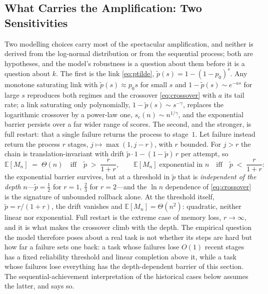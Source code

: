 \documentclass{article}
\begin{document}
\subsection{What Carries the Amplification: Two Sensitivities}\label{ssec:sensitivity}
Two modelling choices carry most of the spectacular amplification, and neither is derived from the log-normal distribution or from the sequential process; both are hypotheses, and the model's robustness is a question about them before it is a question about $k$. The first is the link \eqref{eq:ptilde}, $\widetilde{p}(s) = 1 - (1-p_0)^{s}$. Any monotone saturating link with $\widetilde{p}(s) \approx p_0 s$ for small $s$ and $1 - \widetilde{p}(s) \sim e^{-a s}$ for large $s$ reproduces both regimes and the crossover \eqref{eq:crossover} with $a$ its tail rate; a link saturating only polynomially, $1 - \widetilde{p}(s) \sim s^{-\gamma}$, replaces the logarithmic crossover by a power-law one, $s_c(n) \sim n^{1/\gamma}$, and the exponential barrier persists over a far wider range of scores. The second, and the stronger, is full restart: that a single failure returns the process to stage~$1$. Let failure instead return the process $r$ stages, $j \mapsto \max(1, j - r)$, with $r$ bounded. For $j > r$ the chain is translation-invariant with drift $\widetilde{p} \cdot 1 - (1 - \widetilde{p})\, r$ per attempt, so
\begin{equation}\label{eq:rollback}
\mathbb{E}[M_n] \;=\; \Theta(n) \quad\text{iff}\quad \widetilde{p} \;>\; \frac{r}{1+r}, \qquad \mathbb{E}[M_n] \;\text{exponential in } n \quad\text{iff}\quad \widetilde{p} \;<\; \frac{r}{1+r}:
\end{equation}
the exponential barrier survives, but at a threshold in $\widetilde{p}$ that is \emph{independent of the depth} $n$---$\widetilde{p} = \tfrac12$ for $r = 1$, $\tfrac23$ for $r = 2$---and the $\ln n$ dependence of \eqref{eq:crossover} is the signature of unbounded rollback alone. At the threshold itself, $\widetilde{p} = r/(1+r)$, the drift vanishes and $\mathbb{E}[M_n] = \Theta(n^{2})$: quadratic, neither linear nor exponential. Full restart is the extreme case of memory loss, $r \to \infty$, and it is what makes the crossover climb with the depth. The empirical question the model therefore poses about a real task is not whether its steps are hard but how far a failure sets one back: a task whose failures lose $O(1)$ recent stages has a fixed reliability threshold and linear completion above it, while a task whose failures lose everything has the depth-dependent barrier of this section. The sequential-achievement interpretation of the historical cases below assumes the latter, and says so.
\end{document}
